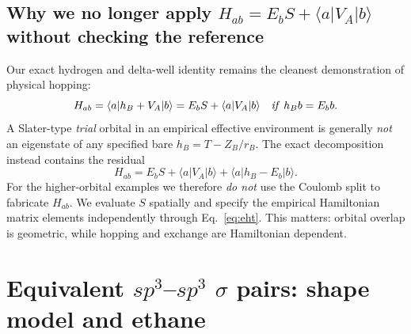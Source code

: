 \documentclass[11pt,letterpaper]{article}
\newcommand{\mel}[3]{\langle #1\lvert #2\rvert #3\rangle}
\begin{document}
\subsection{Why we no longer apply $H_{ab}=E_bS+\mel a{V_A}b$ without checking the reference}
Our exact hydrogen and delta-well identity remains the cleanest demonstration of physical hopping:
\begin{equation}
H_{ab}=\mel a{h_B+V_A}b=E_bS+\mel a{V_A}b
\quad\text{\emph{if} }h_Bb=E_bb.
\end{equation}
A Slater-type \emph{trial} orbital in an empirical effective environment is generally \emph{not} an eigenstate of any specified bare $h_B=T-Z_B/r_B$. The exact decomposition instead contains the residual
\begin{equation}\label{eq:sto-residual}
\boxed{H_{ab}=E_bS+\mel a{V_A}b+\mel a{h_B-E_b}b.}
\end{equation}
For the higher-orbital examples we therefore \emph{do not} use the Coulomb split to fabricate $H_{ab}$. We evaluate $S$ spatially and specify the empirical Hamiltonian matrix elements independently through Eq.~\eqref{eq:eht}. This matters: orbital overlap is geometric, while hopping and exchange are Hamiltonian dependent.
\FloatBarrier

\section{Equivalent $sp^3$--$sp^3$ $\sigma$ pairs: shape model and ethane}
\end{document}
